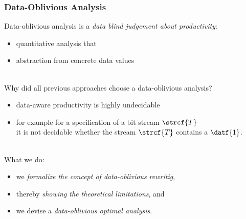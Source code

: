 \documentclass[10pt]{beamer}
\begin{document}
\begin{frame}%
  \frametitle{Data-Oblivious Analysis}

Data-oblivious analysis is a \emph{data blind judgement about productivity}:
\begin{itemize}
 \item quantitative analysis that 
 \item abstraction from concrete data values
\end{itemize}\ \\[1ex]

Why did all previous approaches choose a data-oblivious analysis?
\begin{itemize}
 \item data-aware productivity is highly undecidable
 \item for example for a specification of a bit stream $\strcf{T}$\\
       it is not decidable whether the stream $\strcf{T}$ contains a $\datf{1}$.
\end{itemize}\ \\[1ex]

What we do:
\begin{itemize}
 \item we \emph{formalize the concept of data-oblivious rewritig},
 \item thereby \emph{showing the theoretical limitations}, and
 \item we devise a \emph{data-oblivious optimal analysis}.
\end{itemize}

\end{frame}%


\end{document}
